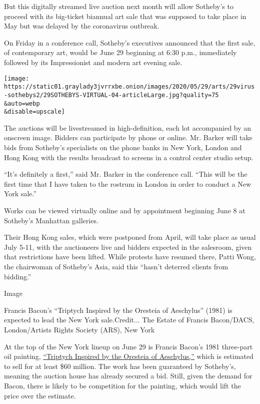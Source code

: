 But this digitally streamed live auction next month will allow Sotheby's
to proceed with its big-ticket biannual art sale that was supposed to
take place in May but was delayed by the coronavirus outbreak.

On Friday in a conference call, Sotheby's executives announced that the
first sale, of contemporary art, would be June 29 beginning at 6:30
p.m., immediately followed by its Impressionist and modern art evening
sale.

\texttt{[image: https://static01.graylady3jvrrxbe.onion/images/2020/05/29/arts/29virus-sothebys2/29SOTHEBYS-VIRTUAL-04-articleLarge.jpg?quality=75\\\&auto=webp\\\&disable=upscale]}

The auctions will be livestreamed in high-definition, each lot
accompanied by an onscreen image. Bidders can participate by phone or
online. Mr. Barker will take bids from Sotheby's specialists on the
phone banks in New York, London and Hong Kong with the results broadcast
to screens in a control center studio setup.

``It's definitely a first,'' said Mr. Barker in the conference call.
``This will be the first time that I have taken to the rostrum in London
in order to conduct a New York sale.''

Works can be viewed virtually online and by appointment beginning June 8
at Sotheby's Manhattan galleries.

Their Hong Kong sales, which were postponed from April, will take place
as usual July 5-11, with the auctioneers live and bidders expected in
the salesroom, given that restrictions have been lifted. While protests
have resumed there, Patti Wong, the chairwoman of Sotheby's Asia, said
this ``hasn't deterred clients from bidding.''

Image

Francis Bacon's ``Triptych Inspired by the Oresteia of Aeschylus''
(1981) is expected to lead the New York sale.Credit... The Estate of
Francis Bacon/DACS, London/Artists Rights Society (ARS), New York

At the top of the New York lineup on June 29 is Francis Bacon's 1981
three-part oil painting,
\href{https://www.sothebys.com/en/press/sothebys-to-offer-francis-bacons-large-format-triptych-inspired-by-the-oresteia-of-aeschylus-this-may-in-new-york}{``Triptych
Inspired by the Oresteia of Aeschylus,''} which is estimated to sell for
at least \$60 million. The work has been guaranteed by Sotheby's,
meaning the auction house has already secured a bid. Still, given the
demand for Bacon, there is likely to be competition for the painting,
which would lift the price over the estimate.

